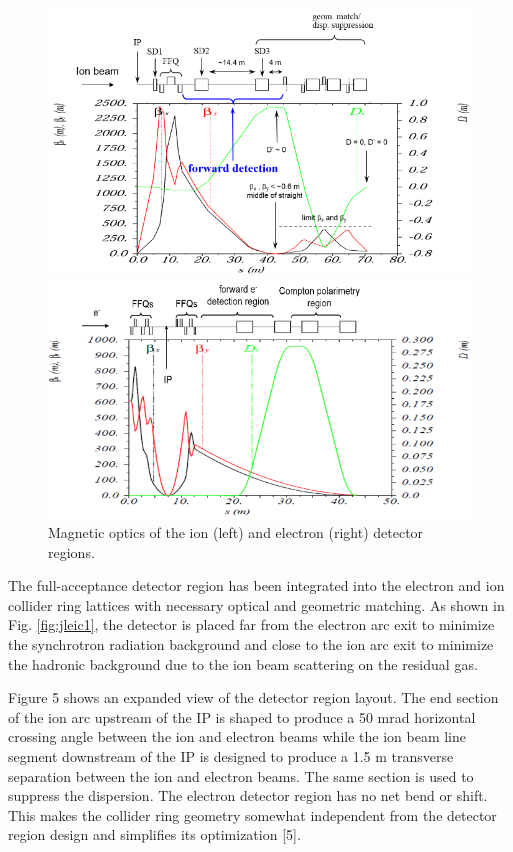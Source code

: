 \begin{figure}
	\centering
	\begin{minipage}{0.45\textwidth}
		\centering
		\includegraphics[width=.75\textwidth]{../../img/ion_magnet_optics}
	\end{minipage}\hfill
	\begin{minipage}{0.45\textwidth}
		\centering	
		\includegraphics[width=.75\textwidth]{../../img/electron_magnet_optics}	
	\end{minipage}
	\caption{Magnetic optics of the ion (left) and electron (right) detector regions.}
	\label{fig:magnet_optics}
\end{figure}

The full-acceptance detector region has been integrated into the electron and ion collider ring lattices with necessary optical and geometric matching. As shown in Fig. \ref{fig:jleic1}, the detector is placed far from the electron arc exit to minimize the synchrotron radiation background and close to the ion arc exit to minimize the hadronic background due to the ion beam scattering on the residual gas.

Figure 5 shows an expanded view of the detector region layout. The end section of the ion arc upstream of the IP is shaped to produce a 50 mrad horizontal crossing angle between the ion and electron beams while the ion beam line segment downstream of the IP is designed to produce a 1.5 m transverse separation between the ion and electron beams. The same section is used to suppress the dispersion. The electron detector region has no net bend or shift. This makes the collider ring geometry somewhat independent from the detector region design and simplifies its optimization [5].

